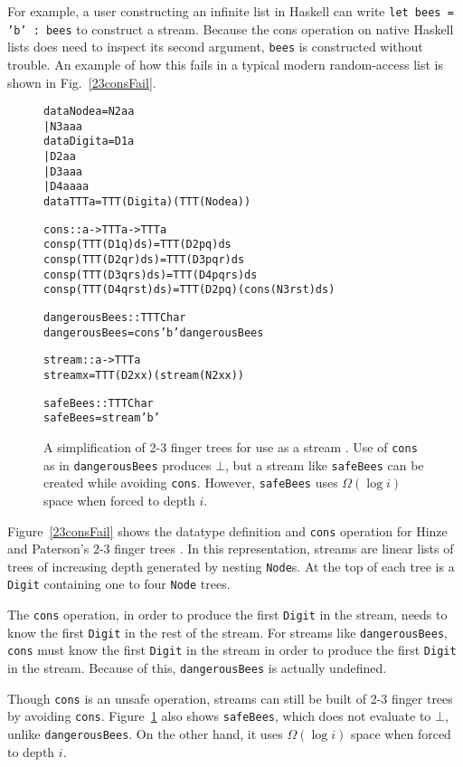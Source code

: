 \documentclass[envcountsect]{llncs}
\begin{document}
For example, a user constructing an infinite list in Haskell can write {\tt let bees = 'b' : bees} to construct a stream.
Because the cons operation on native Haskell lists does need to inspect its second argument, {\tt bees} is constructed without trouble.
An example of how this fails in a typical modern random-access list is shown in Fig.~\ref{23consFail}.

\begin{figure}
\begin{alltt}
data Node a = N2 a a
            | N3 a a a
data Digit a = D1 a
             | D2 a a
             | D3 a a a
             | D4 a a a a
data TTT a = TTT (Digit a) (TTT (Node a))

cons :: a -> TTT a -> TTT a
cons p (TTT (D1 q)       ds) = TTT (D2 p q) ds
cons p (TTT (D2 q r)     ds) = TTT (D3 p q r) ds
cons p (TTT (D3 q r s)   ds) = TTT (D4 p q r s) ds
cons p (TTT (D4 q r s t) ds) = TTT (D2 p q) (cons (N3 r s t) ds)

dangerousBees :: TTT Char
dangerousBees = cons 'b' dangerousBees

stream :: a -> TTT a
stream x = TTT (D2 x x) (stream (N2 x x))

safeBees :: TTT Char
safeBees = stream 'b'
\end{alltt}
\caption{
A simplification of 2-3 finger trees for use as a stream \cite{HinzePat}. 
Use of {\tt cons} as in {\tt dangerousBees} produces $\bot$, but a stream like {\tt safeBees} can be created while avoiding {\tt cons}.
However, {\tt safeBees} uses $\Omega(\log i)$ space when forced to depth $i$.
}
\label{23consFail}
\label{23stream}
\end{figure}

Figure~\ref{23consFail} shows the datatype definition and {\tt cons} operation for Hinze and Paterson's 2-3 finger trees \cite{HinzePat}.
In this representation, streams are linear lists of trees of increasing depth generated by nesting {\tt Node}s.
At the top of each tree is a {\tt Digit} containing one to four {\tt Node} trees.

The {\tt cons} operation, in order to produce the first {\tt Digit} in the stream, needs to know the first {\tt Digit} in the rest of the stream.
For streams like {\tt dangerousBees}, {\tt cons} must know the first {\tt Digit} in the stream in order to produce the first {\tt Digit} in the stream.
Because of this, {\tt dangerousBees} is actually undefined.

Though {\tt cons} is an unsafe operation, streams can still be built of 2-3 finger trees by avoiding {\tt cons}.
Figure~\ref{23stream} also shows {\tt safeBees}, which does not evaluate to $\bot$, unlike {\tt dangerousBees}.
On the other hand, it uses $\Omega(\log i)$ space when forced to depth $i$.
\end{document}
